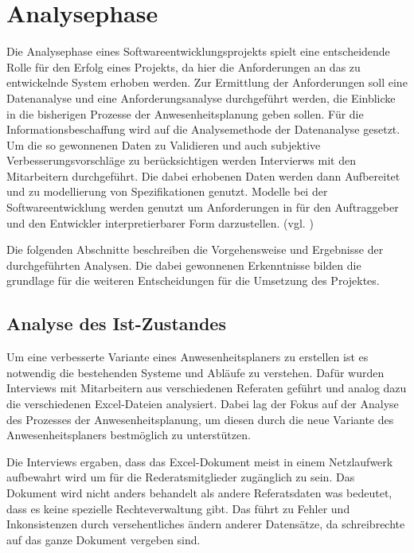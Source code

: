\section{Analysephase}
\label{sec:Analysephase}
Die Analysephase eines Softwareentwicklungsprojekts spielt eine entscheidende Rolle für den Erfolg eines Projekts, da hier die Anforderungen an das zu entwickelnde System erhoben werden. Zur Ermittlung der Anforderungen soll eine Datenanalyse und eine Anforderungsanalyse durchgeführt werden, die Einblicke in die bisherigen Prozesse der Anwesenheitsplanung geben sollen. Für die Informationsbeschaffung wird auf die Analysemethode der Datenanalyse gesetzt. Um die so gewonnenen Daten zu Validieren und auch subjektive Verbesserungsvorschläge zu berücksichtigen werden Intervierws mit den Mitarbeitern durchgeführt. Die dabei erhobenen Daten werden dann Aufbereitet und zu modellierung von Spezifikationen genutzt. Modelle bei der Softwareentwicklung werden genutzt um Anforderungen in für den Auftraggeber und den Entwickler interpretierbarer Form darzustellen. (vgl. \cite[S. 43]{dumke-2003})

Die folgenden Abschnitte beschreiben die Vorgehensweise und Ergebnisse der durchgeführten Analysen. Die dabei gewonnenen Erkenntnisse bilden die grundlage für die weiteren Entscheidungen für die Umsetzung des Projektes.


\subsection{Analyse des Ist-Zustandes}
\label{sec:Ist-Zustand}
Um eine verbesserte Variante eines Anwesenheitsplaners zu erstellen ist es notwendig die bestehenden Systeme und Abläufe zu verstehen. Dafür wurden Interviews mit Mitarbeitern aus verschiedenen Referaten geführt und analog dazu die verschiedenen Excel-Dateien analysiert. Dabei lag der Fokus auf der Analyse des Prozesses der Anwesenheitsplanung, um diesen durch die neue Variante des Anwesenheitsplaners bestmöglich zu unterstützen.

Die Interviews ergaben, dass das Excel-Dokument meist in einem Netzlaufwerk aufbewahrt wird um für die Rederatsmitglieder zugänglich zu sein. Das Dokument wird nicht anders behandelt als andere Referatsdaten was bedeutet, dass es keine spezielle Rechteverwaltung gibt. Das führt zu Fehler und Inkonsistenzen durch versehentliches ändern anderer Datensätze, da schreibrechte auf das ganze Dokument vergeben sind.

